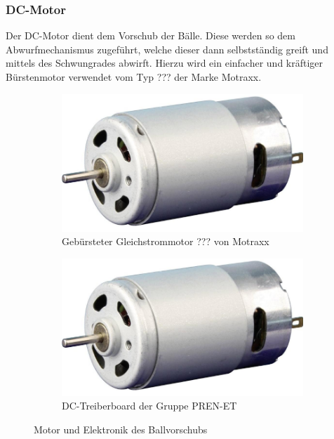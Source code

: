\subsubsection{DC-Motor}
Der DC-Motor dient dem Vorschub der Bälle. Diese werden so dem
Abwurfmechanismus zugeführt, welche dieser dann selbstständig
greift und mittels des Schwungrades abwirft. Hierzu wird ein
einfacher und kräftiger Bürstenmotor verwendet vom Typ ???
der Marke Motraxx.

\begin{figure}[h!]
	\centering
	\begin{subfigure}[b]{0.45\textwidth}
		\centering
		\includegraphics[width=1\textwidth]{../../fig/et/dc_01.png}
		\caption{Gebürsteter Gleichstrommotor ??? von Motraxx}
	\end{subfigure}
	\begin{subfigure}[b]{0.45\textwidth}
		\centering
		\includegraphics[width=1\textwidth]{../../fig/et/dc_01.png}
		\caption{DC-Treiberboard der Gruppe PREN-ET}
	\end{subfigure}
	\caption{Motor und Elektronik des Ballvorschubs}
\end{figure}

